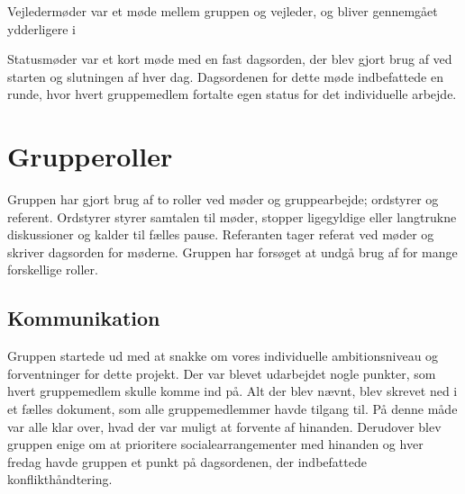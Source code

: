 Vejledermøder var et møde mellem gruppen og vejleder, og bliver gennemgået ydderligere i 

Statusmøder var et kort møde med en fast dagsorden, der blev gjort brug af ved starten og slutningen af hver dag. Dagsordenen for dette møde indbefattede en runde, hvor hvert gruppemedlem fortalte egen status for det individuelle arbejde.

\section{Grupperoller}
Gruppen har gjort brug af to roller ved møder og gruppearbejde; ordstyrer og referent. Ordstyrer styrer samtalen til møder, stopper ligegyldige
eller langtrukne diskussioner og kalder til fælles pause. Referanten tager referat ved møder og skriver dagsorden for møderne. Gruppen har forsøget at undgå brug af for mange forskellige roller.

\subsection{Kommunikation}
Gruppen startede ud med at snakke om vores individuelle ambitionsniveau og forventninger for dette projekt. Der var blevet udarbejdet nogle punkter, som hvert gruppemedlem skulle komme ind på. Alt der blev nævnt, blev skrevet ned i et fælles dokument, som alle gruppemedlemmer havde tilgang til. På denne måde var alle klar over, hvad der var muligt at forvente af hinanden. Derudover blev gruppen enige om at prioritere socialearrangementer med hinanden og hver fredag havde gruppen et punkt på dagsordenen, der indbefattede konflikthåndtering. 
